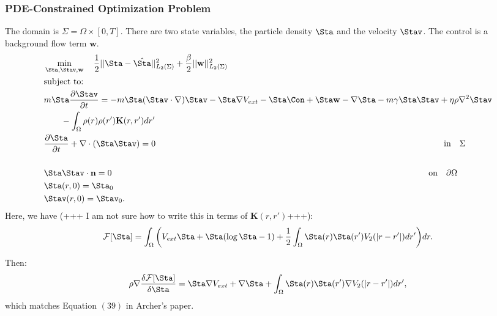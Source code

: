 
\subsubsection{PDE-Constrained Optimization Problem}
The domain is $\Sigma=\Omega \times [0,T]$. There are two state variables, the particle density $\Sta$ and the velocity $\Stav$. The control is a background flow term $\mathbf{w}$. 
\begin{align*}
&\min_{\Sta,\Stav,\mathbf{w} } \quad \frac{1}{2}||\Sta - \hat \Sta||_{L_2(\Sigma)}^2  +\frac{\beta}{2}||\mathbf{w}||_{L_2(\Sigma)}^2\\
&\text{subject to:}\\
&m \Sta \frac{\partial \Stav}{\partial t}= - m \Sta (\Stav \cdot \nabla)\Stav -\Sta \nabla V_{ext} -\Sta \Con +\Sta \mathbf{w} - \nabla \Sta - m\gamma \Sta \Stav + \eta \rho \nabla^2 \Stav \\
& \quad \quad -\int_\Omega \rho(r) \rho(r') \mathbf{K}(r,r')dr' \\
&\frac{\partial \Sta}{\partial t} + \nabla \cdot (\Sta \Stav)=0 \qquad\qquad \qquad\qquad\qquad\quad \quad\quad\qquad \qquad\qquad \qquad\qquad\qquad\quad \qquad\qquad\qquad\quad\ \ \text{in} \quad \Sigma\\
\\
&\Sta \Stav \cdot \mathbf{n} =0\qquad\qquad \qquad\qquad\qquad\qquad\qquad\qquad\qquad \qquad\qquad \qquad\qquad\qquad \qquad\qquad\qquad\quad \qquad \text{on} \quad \partial  \Omega\\
& \Sta(r,0)=\Sta_0\\
& \Stav(r,0)=\Stav_0.
\end{align*}
Here, we have (+++ I am not sure how to write this in terms of $\mathbf{K}(r,r')$+++):
\begin{align*}
\mathcal{F}[\Sta]=\int_\Omega  \bigg( V_{ext}\Sta + \Sta (\log \Sta -1) +  \frac{1}{2}\int_\Omega \Sta(r) \Sta(r')V_2(|r-r'|)dr' \bigg) dr.
\end{align*}

Then:
\begin{align*}
\rho \nabla \frac{\delta \mathcal{F}[\Sta]}{\delta \Sta} = \Sta \nabla V_{ext} + \nabla \Sta + \int_\Omega \Sta(r) \Sta(r') \nabla V_2(|r-r'|)dr',
\end{align*}
which matches Equation $(39)$ in Archer's paper.
